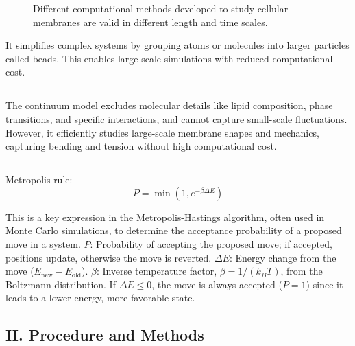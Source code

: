 \documentclass[12pt]{article}
\begin{document}
\begin{flushleft}
\begin{figure}[!ht]
  \centering
  \caption{Different computational methods developed to study cellular membranes are valid in different length and time scales.\cite{chabanon2017systems}}
\end{figure}

It simplifies complex systems by grouping atoms or molecules into larger particles called beads. This enables large-scale simulations with reduced computational cost.

\vspace{-1em}
\subsection* {}


The continuum model excludes molecular details like lipid composition, phase transitions, and specific interactions, and cannot capture small-scale fluctuations. However, it efficiently studies large-scale membrane shapes and mechanics, capturing bending and tension without high computational cost.



\subsection*{}





Metropolis rule:
\begin{equation}
P = \min\left(1, e^{-\beta \Delta E}\right)
\end{equation}

This is a key expression in the Metropolis-Hastings algorithm, often used in Monte Carlo simulations, to determine the acceptance probability of a proposed move in a system. $P$: Probability of accepting the proposed move; if accepted, positions update, otherwise the move is reverted.
$\Delta E$: Energy change from the move ($E_{\text{new}} - E_{\text{old}}$).
$\beta$: Inverse temperature factor, $\beta = 1 / (k_B T)$, from the Boltzmann distribution. 
If $\Delta E \leq 0$, the move is always accepted ($P = 1$) since it leads to a lower-energy, more favorable state.
 

\subsection*{II. Procedure and Methods} 



\end{flushleft}
\end{document}
